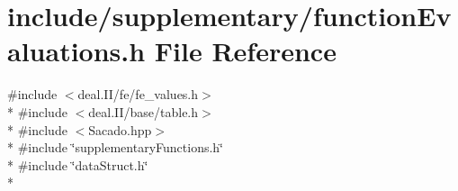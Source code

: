 \section{include/supplementary/function\-Evaluations.h File Reference}
\label{function_evaluations_8h}
{\ttfamily \#include $<$deal.\-I\-I/fe/fe\-\_\-values.\-h$>$}\\*
{\ttfamily \#include $<$deal.\-I\-I/base/table.\-h$>$}\\*
{\ttfamily \#include $<$Sacado.\-hpp$>$}\\*
{\ttfamily \#include \char`\"{}supplementary\-Functions.\-h\char`\"{}}\\*
{\ttfamily \#include \char`\"{}data\-Struct.\-h\char`\"{}}\\*
